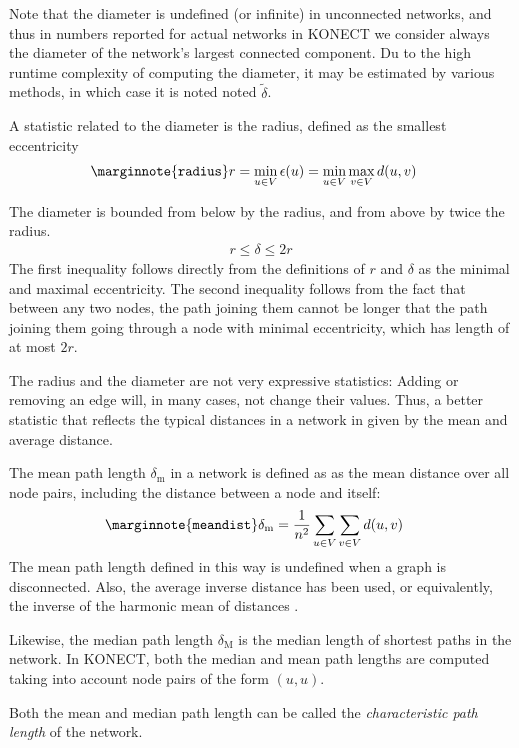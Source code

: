 \documentclass{article}
\begin{document}
Note that the diameter is undefined (or infinite) in unconnected
networks, and thus in numbers reported for actual networks in KONECT we
consider always the diameter of the network's largest connected
component.  Du to the high runtime complexity of computing the diameter,
it may be estimated by various methods, in which case it is noted noted
$\tilde \delta$.

A statistic related to the diameter is the radius, defined as the
smallest eccentricity
\begin{align}
  \marginnote{\texttt{radius}} r &= \min_{u \in V} \epsilon(u) = \min_{u
    \in V} \max_{v \in V} d(u,v)
\end{align}

The diameter is bounded from below by the radius, and from above by
twice the radius.  
\begin{align*}
  r \leq \delta \leq 2r
\end{align*}
The first inequality follows directly from the definitions of $r$ and
$\delta$ as the minimal and maximal eccentricity.  The second inequality
follows from the fact that between any two nodes, the path joining them
cannot be longer that the path joining them going through a node with
minimal eccentricity, which has length of at most $2r$. 

The radius and the diameter are not very expressive statistics: Adding
or removing an edge will, in many cases, not change their values.  Thus,
a better statistic that reflects the typical distances in a network in
given by the mean and average distance.

The mean path length $\delta_{\mathrm m}$ in a network is defined as as
the mean distance over all node pairs, including the distance between a
node and itself:
\begin{align}
  \marginnote{\texttt{meandist}} \delta_{\mathrm m} &= \frac 1 {n^2}
  \sum_{u \in V} \sum_{v\in V} d(u,v)
\end{align}
The mean path length defined in this way is undefined when a graph is
disconnected.  Also, the average inverse distance has been used, or
equivalently, the inverse of the harmonic mean of distances \citep{b877}. 

Likewise, the median path length $\delta_{\mathrm M}$ is the median
length of shortest paths in the network.  In KONECT, both the median and
mean path lengths are computed taking into account node pairs of the
form $(u,u)$.

Both the mean and median path length can be called the
\emph{characteristic path length} of the network.
\end{document}

